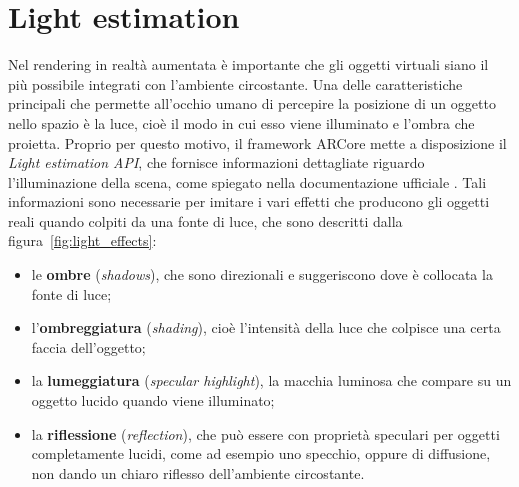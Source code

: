 \documentclass[crop=false, class=book]{standalone}
\begin{document}
	\section{Light estimation}
	\label{sec:light_est}
	Nel rendering in realtà aumentata è importante che gli oggetti virtuali siano il più possibile integrati con l'ambiente circostante. Una delle caratteristiche principali che permette all'occhio umano di percepire la posizione di un oggetto nello spazio è la luce, cioè il modo in cui esso viene illuminato e l'ombra che proietta. 
	Proprio per questo motivo, il framework ARCore mette a disposizione il \textit{Light estimation API}, che fornisce informazioni dettagliate riguardo l'illuminazione della scena, come spiegato nella documentazione ufficiale \cite{google2022light}.
	Tali informazioni sono necessarie per imitare i vari effetti che producono gli oggetti reali quando colpiti da una fonte di luce, che sono descritti dalla figura~\vref{fig:light_effects}:
	\begin{itemize}
		\item le \textbf{ombre} (\textit{shadows}), che sono direzionali e suggeriscono dove è collocata la fonte di luce;
		\item l'\textbf{ombreggiatura} (\textit{shading}), cioè l'intensità della luce che colpisce una certa faccia dell'oggetto;
		\item la \textbf{lumeggiatura} (\textit{specular highlight}), la macchia luminosa che compare su un oggetto lucido quando viene illuminato;
		\item la \textbf{riflessione} (\textit{reflection}), che può essere con proprietà speculari per oggetti completamente lucidi, come ad esempio uno specchio, oppure di diffusione, non dando un chiaro riflesso dell'ambiente circostante. 
	\end{itemize}
	
\end{document}
